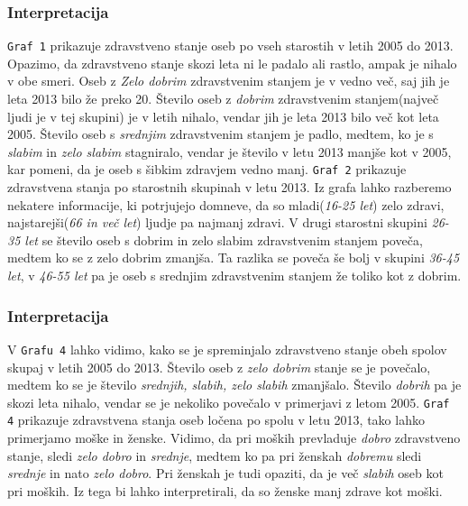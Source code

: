 \documentclass[11pt,a4paper]{article}
\begin{document}
\subsubsection{Interpretacija}
\verb+Graf 1+ prikazuje zdravstveno stanje oseb po vseh starostih v letih 2005 do 2013. Opazimo, da zdravstveno stanje skozi leta ni le padalo ali rastlo, ampak je nihalo v obe smeri. Oseb z \textit{Zelo dobrim} zdravstvenim stanjem je v vedno več, saj jih je leta 2013 bilo že preko 20. Število oseb  z \textit{dobrim} zdravstvenim stanjem(največ ljudi je v tej skupini) je v letih nihalo, vendar jih je leta 2013 bilo več kot leta 2005. Število oseb s \textit{srednjim} zdravstvenim stanjem je padlo, medtem, ko je s \textit{slabim} in \textit{zelo slabim} stagniralo, vendar je število v letu 2013 manjše kot v 2005, kar pomeni, da je oseb s šibkim zdravjem vedno manj.
\verb+Graf 2+ prikazuje zdravstvena stanja po starostnih skupinah v letu 2013. Iz grafa lahko razberemo nekatere informacije, ki potrjujejo domneve, da so mladi(\textit{16-25 let}) zelo zdravi, najstarejši(\textit{66 in več let}) ljudje pa najmanj zdravi. V drugi starostni skupini \textit{26-35 let} se število oseb s dobrim in zelo slabim zdravstvenim stanjem poveča, medtem ko se z zelo dobrim zmanjša. Ta razlika se poveča še bolj v skupini \textit{36-45 let}, v \textit{46-55 let} pa je oseb s srednjim zdravstvenim stanjem že toliko kot z dobrim.

\subsubsection{Interpretacija}
V \verb+Grafu 4+ lahko vidimo, kako se je spreminjalo zdravstveno stanje obeh spolov skupaj v letih 2005 do 2013. Število oseb z  \textit{zelo dobrim} stanje se je povečalo, medtem ko se je število \textit{srednjih, slabih, zelo slabih} zmanjšalo. Število \textit{dobrih} pa je skozi leta nihalo, vendar se je nekoliko povečalo v primerjavi z letom 2005.
\verb+Graf 4+ prikazuje zdravstvena stanja oseb ločena po spolu v letu 2013, tako lahko primerjamo moške in ženske. Vidimo, da pri moških prevladuje \textit{dobro} zdravstveno stanje, sledi \textit{zelo dobro} in \textit{srednje}, medtem ko pa pri ženskah \textit{dobremu} sledi \textit{srednje} in nato \textit{zelo dobro}. Pri ženskah je tudi opaziti, da je več \textit{slabih} oseb kot pri moških. Iz tega bi lahko interpretirali, da so ženske manj zdrave kot moški.



\end{document}
